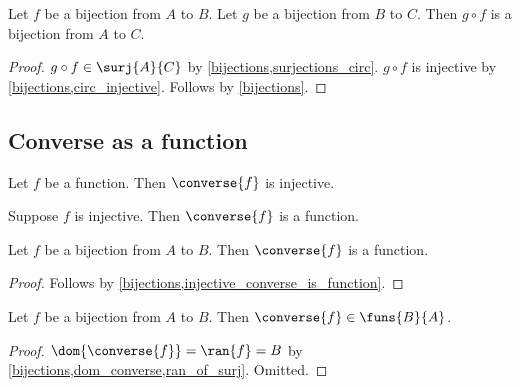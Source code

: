 \begin{proposition}\label{bijection_circ}
    Let $f$ be a bijection from $A$ to $B$.
    Let $g$ be a bijection from $B$ to $C$.
    Then $g\circ f$ is a bijection from $A$ to $C$.
\end{proposition}
\begin{proof}
    $g\circ f\in\surj{A}{C}$ by \cref{bijections,surjections_circ}.
    $g\circ f$ is injective by \cref{bijections,circ_injective}.
    Follows by \cref{bijections}.
\end{proof}

\subsection{Converse as a function}

\begin{proposition}\label{converse_of_function_is_injective}
    Let $f$ be a function.
    Then $\converse{f}$ is injective. %
\end{proposition}

\begin{proposition}\label{injective_converse_is_function}
    Suppose $f$ is injective. %
    Then $\converse{f}$ is a function.
\end{proposition}

\begin{proposition}\label{bijective_converse_is_function}
    Let $f$ be a bijection from $A$ to $B$.
    Then $\converse{f}$ is a function.
\end{proposition}
\begin{proof}
    Follows by \cref{bijections,injective_converse_is_function}.
\end{proof}

\begin{proposition}\label{bijective_converse_are_funs}
    Let $f$ be a bijection from $A$ to $B$.
    Then $\converse{f}\in\funs{B}{A}$.
\end{proposition}
\begin{proof}
    $\dom{\converse{f}} = \ran{f} = B$ by \cref{bijections,dom_converse,ran_of_surj}.
    Omitted. %
\end{proof}

